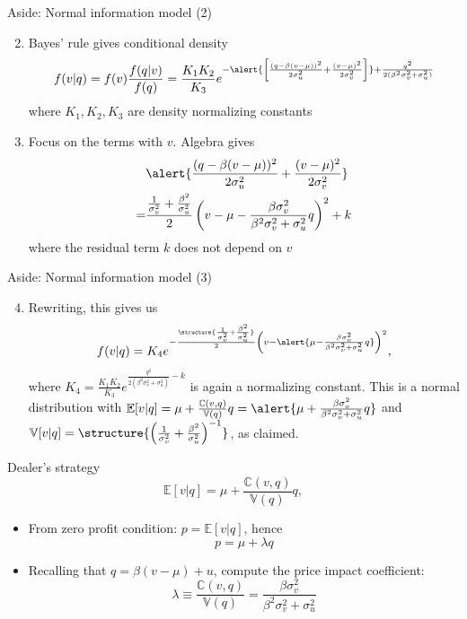 \documentclass[english,10pt
,handout
]{beamer}
\begin{document}
\begin{frame}{Aside: Normal information model (2)}
	\begin{enumerate}
		\setcounter{enumi}{1}
		\item Bayes' rule gives conditional density
		\[
		f(v|q) = f(v) \frac{f(q|v)}{f(q)} = \frac{K_1 K_2}{K_3} e^{-\alert{\left[\frac{(q-\beta(v-\mu))^2}{2\sigma^2_u }+\frac{(v-\mu)^2}{2\sigma^2_v}\right]} + \frac{q^2}{2(\beta^2 \sigma^2_v + \sigma^2_u)}}
		\]
		where $K_1, K_2, K_3$ are density normalizing constants
		\item Focus on the terms with \alert{$v$}. Algebra gives
		\begin{align*}
		&\alert{\frac{(q-\beta(v-\mu))^2}{2\sigma^2_u} + \frac{(v-\mu)^2}{2\sigma^2_v} }\\
		= &\frac{\frac{1}{\sigma^2_v}+\frac{\beta^2}{\sigma^2_u}}{2}\left(v-\mu-\frac{\beta \sigma^2_v}{\beta^2 \sigma^2_v + \sigma^2_u}q \right)^2 + k
		\end{align*}
		where the residual term $k$ does not depend on $v$
	\end{enumerate}
\end{frame}


\begin{frame}{Aside: Normal information model (3)}
	\begin{enumerate}
		\setcounter{enumi}{3}
		\item Rewriting, this gives us
		\[
			f(v|q) = K_4 e^{-\frac{\structure{\frac{1}{\sigma^2_v}+\frac{\beta^2}{\sigma^2_u}}}{2} \left(v-\alert{\mu-\frac{\beta \sigma^2_v}{\beta^2 \sigma^2_v + \sigma^2_u}q }\right)^2},
		\]
		where $K_4=\frac{K_1 K_2}{K_3}e^{ \frac{q^2}{2(\beta^2 \sigma^2_v + \sigma^2_u)}-k}$ is again a normalizing constant.
		This is  a normal distribution with $\mathbb{E}[v|q] = \mu + \frac{\mathbb{C}(v,q)}{\mathbb{V}(q)} q=\alert{\mu+\frac{\beta \sigma^2_v}{\beta^2 \sigma^2_v + \sigma^2_u}q}$ and $\mathbb{V}[v|q]=\structure{ \left( \frac{1}{\sigma^2_v}+\frac{\beta^2}{\sigma^2_u} \right)^{-1}}$, as claimed. 
	\end{enumerate}
\end{frame}


\begin{frame}{Dealer's strategy}
	\[
		\mathbb{E}[v|q] = \mu + \frac{\mathbb{C}(v,q)}{\mathbb{V}(q)} q,
	\]
	\begin{itemize}
		\item From zero profit condition: $p = \mathbb{E}[v|q]$, hence
		\[
			p = \mu + \lambda q
		\]
		\item Recalling that $q = \beta(v-\mu) + u$, compute the price impact coefficient: 
		\[
			\lambda \equiv \frac{\mathbb{C}(v,q)}{\mathbb{V}(q)} = \frac{\beta \sigma^2_v}{\beta^2 \sigma^2_v + \sigma^2_u}	
		\]
	\end{itemize}
\end{frame}
\end{document}
